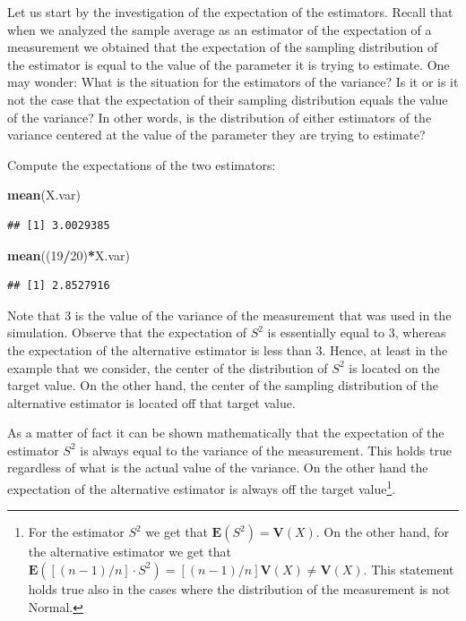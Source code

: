 \documentclass[]{krantz}
\makeatletter
\newenvironment{Shaded}{\begin{snugshade}}{\end{snugshade}}
\newcommand{\DecValTok}[1]{\textcolor[rgb]{0.00,0.00,0.81}{#1}}
\newcommand{\KeywordTok}[1]{\textcolor[rgb]{0.13,0.29,0.53}{\textbf{#1}}}
\newcommand{\NormalTok}[1]{#1}
\newcommand{\OperatorTok}[1]{\textcolor[rgb]{0.81,0.36,0.00}{\textbf{#1}}}
\newcommand{\Expec}{\mathbf{E}}
\newcommand{\Var}{\mathbf{V}}
\newenvironment{kframe}{%
\medskip{}
\setlength{\fboxsep}{.8em}
 \def\at@end@of@kframe{}%
 \ifinner\ifhmode%
  \def\at@end@of@kframe{\end{minipage}}%
  \begin{minipage}{\columnwidth}%
 \fi\fi%
 \def\FrameCommand##1{\hskip\@totalleftmargin \hskip-\fboxsep
 \colorbox{shadecolor}{##1}\hskip-\fboxsep
     \hskip-\linewidth \hskip-\@totalleftmargin \hskip\columnwidth}%
 \MakeFramed {\advance\hsize-\width
   \@totalleftmargin\z@ \linewidth\hsize
   \@setminipage}}%
 {\par\unskip\endMakeFramed%
 \at@end@of@kframe}
\renewenvironment{Shaded}{\begin{kframe}}{\end{kframe}}
\theoremstyle{definition}
\theoremstyle{definition}
\theoremstyle{definition}
\theoremstyle{remark}
\makeatother
\begin{document}
Let us start by the investigation of the expectation of the estimators.
Recall that when we analyzed the sample average as an estimator of the
expectation of a measurement we obtained that the expectation of the
sampling distribution of the estimator is equal to the value of the
parameter it is trying to estimate. One may wonder: What is the
situation for the estimators of the variance? Is it or is it not the
case that the expectation of their sampling distribution equals the
value of the variance? In other words, is the distribution of either
estimators of the variance centered at the value of the parameter they
are trying to estimate?

Compute the expectations of the two estimators:

\begin{Shaded}
\begin{Highlighting}[]
\KeywordTok{mean}\NormalTok{(X.var)}
\end{Highlighting}
\end{Shaded}

\begin{verbatim}
## [1] 3.0029385
\end{verbatim}

\begin{Shaded}
\begin{Highlighting}[]
\KeywordTok{mean}\NormalTok{((}\DecValTok{19}\OperatorTok{/}\DecValTok{20}\NormalTok{)}\OperatorTok{*}\NormalTok{X.var)}
\end{Highlighting}
\end{Shaded}

\begin{verbatim}
## [1] 2.8527916
\end{verbatim}

Note that 3 is the value of the variance of the measurement that was
used in the simulation. Observe that the expectation of \(S^2\) is
essentially equal to 3, whereas the expectation of the alternative
estimator is less than 3. Hence, at least in the example that we
consider, the center of the distribution of \(S^2\) is located on the
target value. On the other hand, the center of the sampling distribution
of the alternative estimator is located off that target value.

As a matter of fact it can be shown mathematically that the expectation
of the estimator \(S^2\) is always equal to the variance of the
measurement. This holds true regardless of what is the actual value of
the variance. On the other hand the expectation of the alternative
estimator is always off the target value\footnote{For the estimator \(S^2\) we get that \(\Expec(S^2) = \Var(X)\). On
  the other hand, for the alternative estimator we get that
  \(\Expec([(n-1)/n]\cdot S^2) = [(n-1)/n]\Var(X) \not = \Var(X)\). This
  statement holds true also in the cases where the distribution of the
  measurement is not Normal.}.
\end{document}

